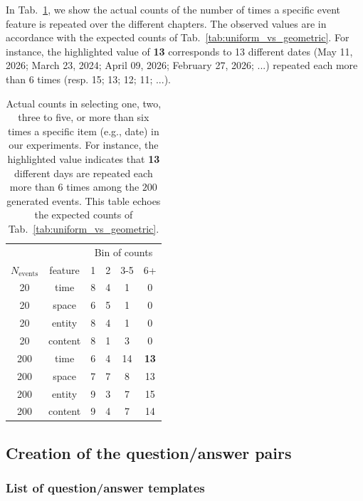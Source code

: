\documentclass{article}
\begin{document}
In Tab.~\ref{tab:geometric_actual}, we show the actual counts of the number of times a specific event feature is repeated over the different chapters. The observed values are in accordance with the expected counts of Tab.~\ref{tab:uniform_vs_geometric}. For instance, the highlighted value of \textbf{13} corresponds to 13 different dates (May 11, 2026; March 23, 2024; April 09, 2026; February 27, 2026; ...) repeated each more than $6$ times (resp. 15; 13; 12; 11; ...).

\begin{table}[h]
\caption{Actual counts in selecting one, two, three to five, or more than six times a specific item (e.g., date) in our experiments. For instance, the highlighted value indicates that \textbf{13} different days are repeated each more than $6$ times among the $200$ generated events. This table echoes the expected counts of Tab.~\ref{tab:uniform_vs_geometric}.} %
\label{tab:geometric_actual}
\centering
\begin{tabular}{cccccc}
  \hline
  &  & \multicolumn{4}{c}{Bin of counts} \\ 
 $N_{\text{events}}$  & feature  & 1 & 2 & 3-5 & 6+ \\ 
  \hline
20 & time  & 8 & 4 & 1 & 0 \\ 
20 & space  & 6 & 5 & 1 & 0 \\ 
20 & entity  & 8 & 4 & 1 & 0 \\ 
20 & content  & 8 & 1 & 3 & 0 \\ 
200 & time & 6 & 4 & 14 & \textbf{13} \\ 
200 & space & 7 & 7 & 8 & 13 \\ 
200 & entity & 9 & 3 & 7 & 15 \\ 
200 & content & 9 & 4 & 7 & 14 \\ 
   \hline
\end{tabular}
\end{table}

\subsection{Creation of the question/answer pairs}\label{app:2qa}

\subsubsection{List of question/answer templates}
\end{document}
